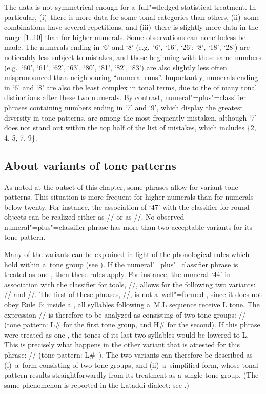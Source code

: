  
The data is not symmetrical enough for a~full"=fledged statistical treatment. In particular,
(i)~there is more data for some tonal categories than others, (ii)~some combinations have several
repetitions, and (iii)~there is slightly more data in the range [1..10] than for higher numerals. Some observations can nonetheless be made. The numerals ending in ‘6’ and ‘8’ (e.g.~‘6’, ‘16’, ‘26’; ‘8’, ‘18’, ‘28’) are noticeably less subject to mistakes, and those beginning with these same numbers (e.g.~‘60’, ‘61’, ‘62’, ‘63’, ‘80’, ‘81’, ‘82’, ‘83’) are also slightly less often mispronounced than neighbouring “numeral-runs”. Importantly, numerals ending in ‘6’ and ‘8’ are also the least complex in tonal terms, due to the  of many tonal distinctions after these two numerals. By contrast, numeral"=plus"=classifier phrases containing numbers ending in ‘7’ and ‘9’, which display the greatest diversity in tone patterns, are among the most frequently mistaken, although ‘7’ does not stand out within the top half of the list of mistakes, which includes \{2, 4, 5, 7, 9\}.


\subsection{About variants of tone patterns}
\label{sec:aboutvariantsoftonepatterns}
\largerpage
As noted at the outset of this chapter, some phrases allow for variant tone patterns. This situation is more frequent for higher numerals than for numerals below twenty. For instance, the association of ‘47’ with the classifier for round objects can be realized either as
// or as //. No observed numeral"=plus"=classifier phrase has more than two acceptable variants for its tone
pattern. 

Many of the variants can be explained in light of the phonological rules which hold within a~tone
group (see ). If the numeral"=plus"=classifier phrase is treated as one ,
then these rules apply. For instance, the numeral ‘44’ in association with the classifier for tools, //, allows for the following two variants: // and //. The first of these phrases, //, is not a~well"=formed , since it does not obey Rule~5: inside a , all syllables following a~M.L sequence receive L tone. The expression // is therefore to be analyzed as consisting of two tone groups: // (tone
pattern: L\# for the first tone group, and H\# for the second). If this phrase were treated as one , the tones of its
last two syllables would be lowered to L. This is precisely what happens in the other variant that
is attested for this phrase: // (tone pattern: L\#--). The two variants can
therefore be described as (i)~a~form consisting of two tone groups, and (ii)~a~simplified
form, whose tonal pattern results straightforwardly from its treatment as a~single tone
group. (The same phenomenon is reported in the Lataddi dialect: see \citealt{dobbsetal2016}.)

